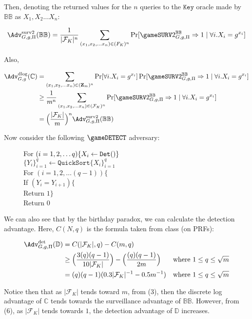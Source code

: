 Then, denoting the returned values for the $n$ queries to the $\mathtt{Key}$ oracle made by $\mathbb{BB}$ as $X_1,X_2\dots X_n$:

$$\Adv^\text{surv2}_{G,g,\Pi}(\mathbb{BB}) = \frac{1}{|\mathcal{F}_K|^n}\sum_{(x_1,x_2,\dots x_n)\in \mathcal({F}_K)^n}\Pr[\gameSURV2^\mathbb{BB}_{G,g,\Pi}\Rightarrow 1 \mid \forall i.X_i=g^{x_i}]$$

Also, 

\begin{align}
\Adv^\text{dlog}_{G,g}(\mathbb{C}) &= \sum_{(x_1,x_2,\dots x_n)\in (\mathbf{Z}_m)^n}\Pr[\forall i.X_i=g^{x_i}]\Pr[\gameSURV2^\mathbb{BB}_{G,g,\Pi}\Rightarrow 1 \mid \forall i.X_i=g^{x_i}]\\
&\ge \frac{1}{m^n}\sum_{(x_1,x_2,\dots x_n)\in (\mathcal{F}_K)^n}\Pr[\gameSURV2^\mathbb{BB}_{G,g,\Pi}\Rightarrow 1 \mid \forall i.X_i=g^{x_i}]\\
&=\Big(\frac{|\mathcal{F}_K|}{m}\Big)^n\Adv^\text{surv2}_{G,g,\Pi}(\mathbb{BB})
\end{align}

Now consider the following $\gameDETECT$ adversary: 

\begin{figure}[h]
{
For $(i=1,2,\dots q)\{\\
X_i\gets \mathtt{Det()}\}$\\
$\{Y_i\}_{i=1}^q\gets \mathtt{QuickSort}\{X_i\}_{i=1}^q$\\
For $(i=1,2,\dots (q-1))\{$\\
If $(Y_i=Y_{i+1})\{$\\
Return $1\}$\\
Return 0
}
\end{figure}

We can also see that by the birthday paradox, we can calculate the detection advantage. Here, $C(N,q)$ is the formula taken from class (on PRFs): 

\begin{align}
\Adv^\text{det}_{G,g,\Pi}(\mathbb{D}) &= C(|\mathcal{F}_K|,q)-C(m,q)\\
&\ge\Big(\frac{3(q)(q-1)}{10|\mathcal{F}_K|}\Big)-\Big(\frac{(q)(q-1)}{2m}\Big) &\text {where } 1\le q \le \sqrt{m}\\
&=(q)(q-1)(0.3|\mathcal{F}_K|^{-1}-0.5m^{-1}) &\text {where } 1\le q \le \sqrt{m}
\end{align}

Notice then that as $|\mathcal{F}_K|$ tends toward $m$, from (3), then the discrete log advantage of $\mathbb{C}$ tends towards the surveillance advantage of $\mathbb{BB}$. However, from (6), as $|\mathcal{F}_K|$ tends towards $1$, the detection advantage of $\mathbb{D}$ increases. 

